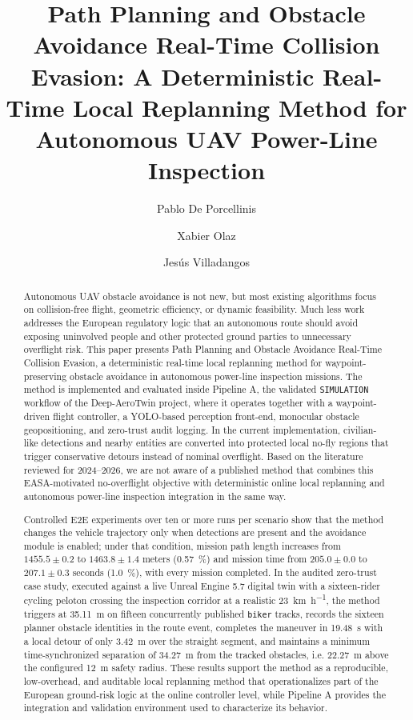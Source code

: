 \documentclass[a4paper,11pt]{article}
\title{Path Planning and Obstacle Avoidance Real-Time Collision Evasion: A Deterministic Real-Time Local Replanning Method for Autonomous UAV Power-Line Inspection}
\author[1,2]{Pablo De Porcellinis}
\author[1]{Xabier Olaz}
\author[1,3]{Jes\'us Villadangos}
\affil[1]{Mathematical Engineering and Computer Science Department, Public University of Navarre, Spain}
\affil[2]{FuVeX Civil SL, Spain}
\affil[3]{Institute of Smart Cities, Public University of Navarre, Spain}
\date{}
\begin{document}
\maketitle

\begin{abstract}
Autonomous UAV obstacle avoidance is not new, but most existing algorithms focus on collision-free flight, geometric efficiency, or dynamic feasibility. Much less work addresses the European regulatory logic that an autonomous route should avoid exposing uninvolved people and other protected ground parties to unnecessary overflight risk. This paper presents Path Planning and Obstacle Avoidance Real-Time Collision Evasion, a deterministic real-time local replanning method for waypoint-preserving obstacle avoidance in autonomous power-line inspection missions. The method is implemented and evaluated inside Pipeline A, the validated \texttt{SIMULATION} workflow of the Deep-AeroTwin project, where it operates together with a waypoint-driven flight controller, a YOLO-based perception front-end, monocular obstacle geopositioning, and zero-trust audit logging. In the current implementation, civilian-like detections and nearby entities are converted into protected local no-fly regions that trigger conservative detours instead of nominal overflight. Based on the literature reviewed for 2024--2026, we are not aware of a published method that combines this EASA-motivated no-overflight objective with deterministic online local replanning and autonomous power-line inspection integration in the same way.

Controlled E2E experiments over ten or more runs per scenario show that the method changes the vehicle trajectory only when detections are present and the avoidance module is enabled; under that condition, mission path length increases from $1455.5 \pm 0.2$ to $1463.8 \pm 1.4$ meters (\SI{0.57}{\percent}) and mission time from $205.0 \pm 0.0$ to $207.1 \pm 0.3$ seconds (\SI{1.0}{\percent}), with every mission completed. In the audited zero-trust case study, executed against a live Unreal Engine 5.7 digital twin with a sixteen-rider cycling peloton crossing the inspection corridor at a realistic \SI{23}{\kilo\meter\per\hour}, the method triggers at \SI{35.11}{\meter} on fifteen concurrently published \texttt{biker} tracks, records the sixteen planner obstacle identities in the route event, completes the maneuver in \SI{19.48}{\second} with a local detour of only \SI{3.42}{\meter} over the straight segment, and maintains a minimum time-synchronized separation of \SI{34.27}{\meter} from the tracked obstacles, i.e. \SI{22.27}{\meter} above the configured \SI{12}{\meter} safety radius. These results support the method as a reproducible, low-overhead, and auditable local replanning method that operationalizes part of the European ground-risk logic at the online controller level, while Pipeline A provides the integration and validation environment used to characterize its behavior.
\end{abstract}
\end{document}
